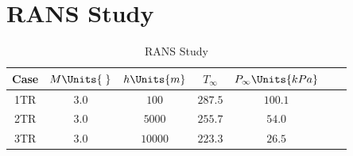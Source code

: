\section{RANS Study\label{ch4:ransStudy}}

\begin{table}[H]
    \begin{center}
        \begin{tabular}{|c|c|c|c|c|c|c|}
            \hline
            Case & $M\Units{\;}$ & $h\Units{m}$ & $T_{\infty}$ &
            $P_{\infty}\Units{kPa}$  \\ 
            \hline \hline
            1TR & $3.0$ & $100$ &   $287.5$ & $100.1$ \\ \hline
            2TR & $3.0$ & $5000$ &  $255.7$ & $54.0$  \\ \hline
            3TR & $3.0$ & $10000$ & $223.3$ & $26.5$  \\\hline 
        \end{tabular}
    \caption{RANS Study \label{tab:ransStudy}}
    \end{center}
\end{table}
